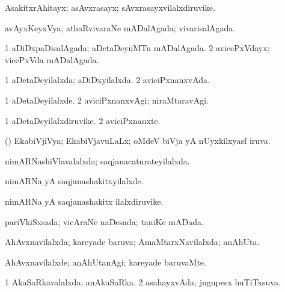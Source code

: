 \bentry
{} 
\gl{\nA}
\expl{}
\bmng
AsakitxrAhitayx; asAvxrasayx; sAvxrasayxvilalxdiruvike. 
\emng
\eentry

\bentry
{} 
\gl{\gu}
\expl{}
\bmng
avAyxKeyxVya; athaRvivaraNe mADalAgada; vivarisalAgada. 
\emng
\eentry

\bentry
{} 
\gl{\gu}
\expl{}
\bmng
\bnum
\num{1} aDiDxpaDisalAgada; aDetaDeyuMTu mADalAgada. 
\num{2} avicePxVdayx; vicePxVda mADalAgada. 
\enum
\emng
\eentry

\bentry
{} 
\gl{\gu}
\expl{}
\bmng
\bnum
\num{1} aDetaDeyilalxda; aDiDxyilalxda. 
\num{2} aviciPxnanxvAda. 
\enum
\emng
\eentry

\bentry
{} 
\gl{\kirxvi}
\expl{}
\bmng
\bnum
\num{1} aDetaDeyilalxde. 
\num{2} aviciPxnanxvAgi; niraMtaravAgi. 
\enum
\emng
\eentry

\bentry
{} 
\gl{\nA}
\expl{}
\bmng
\bnum
\num{1} aDetaDeyilalxdiruvike. 
\num{2} aviciPxnanxte. 
\enum
\emng
\eentry

\bentry
{} 
\gl{\gu}
\expl{}
\bmng
(\jiVvi) EkabiVjiVya; EkabiVjavuLaLx; oMdeV biVja yA nUyxkilxyasf iruva. 
\emng
\eentry

\bentry
{} 
\gl{\gu}
\expl{}
\bmng
nimARNashiVlavalalxda; saqjanacaturateyilalxda. 
\emng
\eentry

\bentry
{} 
\gl{\kirxvi}
\expl{}
\bmng
nimARNa yA saqjanashakitxyilalxde. 
\emng
\eentry

\bentry
{} 
\gl{\nA}
\expl{}
\bmng
nimARNa yA saqjanashakitx ilalxdiruvike. 
\emng
\eentry

\bentry
{} 
\gl{\gu}
\expl{}
\bmng
pariVkiSxsada; vicAraNe naDesada; taniKe mADada. 
\emng
\eentry

\bentry
{} 
\gl{\gu}
\expl{}
\bmng
AhAvxnavilalxda; kareyade baruva; AmaMtarxNavilalxda; anAhUta. 
\emng
\eentry

\bentry
{} 
\gl{\kirxvi}
\expl{}
\bmng
AhAvxnavilalxde; anAhUtanAgi; kareyade baruvaMte. 
\emng
\eentry

\bentry
{} 
\gl{\gu}
\expl{}
\bmng
\bnum
\num{1} AkaSaRkavalalxda; anAkaSaRka. 
\num{2} asahayxvAda; jugupesx huTiTxsuva. 
\enum
\emng
\eentry

